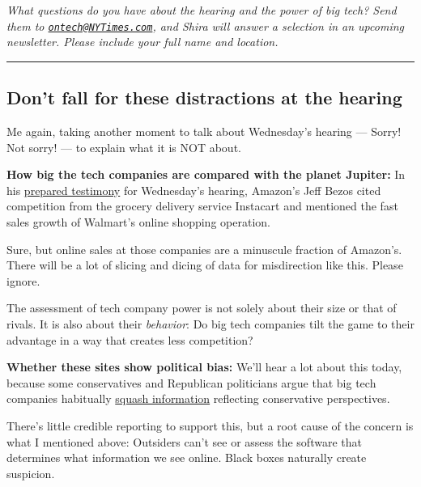 \emph{What questions do you have about the hearing and the power of big
tech? Send them to
\href{mailto:ontech@NYTimes.com}{\nolinkurl{ontech@NYTimes.com}}, and
Shira will answer a selection in an upcoming newsletter. Please include
your full name and location.}

\begin{center}\rule{0.5\linewidth}{\linethickness}\end{center}

\hypertarget{dont-fall-for-these-distractions-at-the-hearing}{%
\subsection{Don't fall for these distractions at the
hearing}\label{dont-fall-for-these-distractions-at-the-hearing}}

Me again, taking another moment to talk about Wednesday's hearing ---
Sorry! Not sorry! --- to explain what it is NOT about.

\textbf{How big the tech companies are compared with the planet
Jupiter:} In his
\href{https://docs.house.gov/meetings/JU/JU05/20200729/110883/HHRG-116-JU05-Wstate-BezosJ-20200729.pdf}{prepared
testimony} for Wednesday's hearing, Amazon's Jeff Bezos cited
competition from the grocery delivery service Instacart and mentioned
the fast sales growth of Walmart's online shopping operation.

Sure, but online sales at those companies are a minuscule fraction of
Amazon's. There will be a lot of slicing and dicing of data for
misdirection like this. Please ignore.

The assessment of tech company power is not solely about their size or
that of rivals. It is also about their \emph{behavior}: Do big tech
companies tilt the game to their advantage in a way that creates less
competition?

\textbf{Whether these sites show political bias:} We'll hear a lot about
this today, because some conservatives and Republican politicians argue
that big tech companies habitually
\href{https://www.nytimes3xbfgragh.onion/2019/05/15/us/donald-trump-twitter-facebook-youtube.html}{squash
information} reflecting conservative perspectives.

There's little credible reporting to support this, but a root cause of
the concern is what I mentioned above: Outsiders can't see or assess the
software that determines what information we see online. Black boxes
naturally create suspicion.

